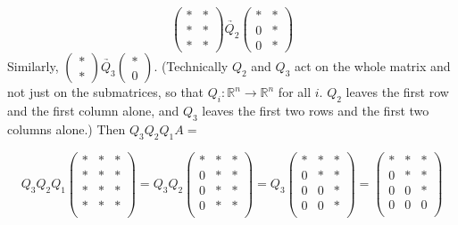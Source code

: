 \begin{equation*}
\begin{pmatrix}
\ast & \ast \\
\ast & \ast \\
\ast & \ast 
\end{pmatrix}
\underrightarrow{Q_2}
\begin{pmatrix}
\ast & \ast \\
0 & \ast \\
0 & \ast 
\end{pmatrix}
\end{equation*}
Similarly, $ \begin{pmatrix} \ast \\ \ast \end{pmatrix} \underrightarrow{Q_3} \begin{pmatrix} \ast \\ 0 \end{pmatrix} $.
(Technically $Q_2$ and $Q_3$ act on the whole matrix and not just on the submatrices, so that $Q_i: \mathbb{R}^n \rightarrow \mathbb{R}^n$ for all $i$.
$Q_2$ leaves the first row and the first column alone, and $Q_3$ leaves the first two rows and the first two columns alone.)
Then $Q_3 Q_2 Q_1 A =$

\begin{equation*}
Q_3 Q_2 Q_1
\begin{pmatrix}
\ast & \ast & \ast \\
\ast & \ast & \ast \\
\ast & \ast & \ast \\
\ast & \ast & \ast \\
\end{pmatrix}
= Q_3 Q_2
\begin{pmatrix}
\ast & \ast & \ast \\
0 & \ast & \ast \\
0 & \ast & \ast \\
0 & \ast & \ast \\
\end{pmatrix}
= Q_3
\begin{pmatrix}
\ast & \ast & \ast \\
0 & \ast & \ast \\
0 & 0 & \ast \\
0 & 0 & \ast \\
\end{pmatrix}
= 
\begin{pmatrix}
\ast & \ast & \ast \\
0 & \ast & \ast \\
0 & 0 & \ast \\
0 & 0 & 0 \\
\end{pmatrix}
\end{equation*}

